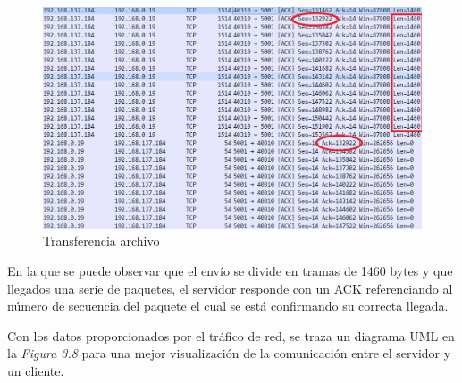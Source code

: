 \documentclass[a4paper,11pt]{book}
\begin{document}
\begin{figure}[hbtp]
\centering
\includegraphics[width = 16 cm]{FIGURAS/intercambio_grabacion.png}
\caption{Transferencia archivo}
\end{figure}

En la que se puede observar que el envío se divide en tramas de 1460 bytes y que llegados una serie de paquetes, el servidor responde con un ACK referenciando al número de secuencia del paquete el cual se está confirmando su correcta llegada.	
				
			Con los datos proporcionados por el tráfico de red, se traza un diagrama UML en la \textit{Figura 3.8} para una mejor visualización de la comunicación entre el servidor y un cliente.
			
\end{document}
